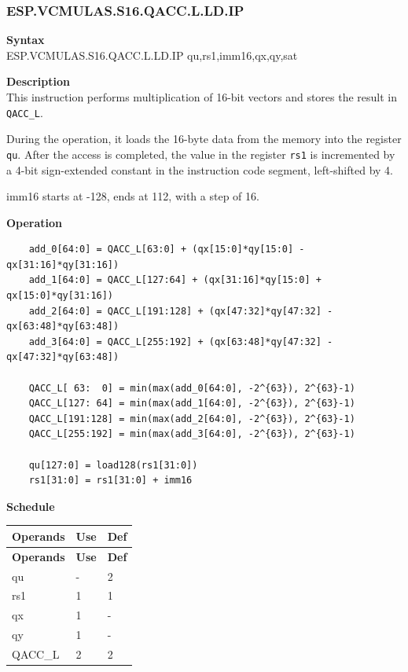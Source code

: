 \newpage
\subsubsection{ESP.VCMULAS.S16.QACC.L.LD.IP}\label{instruction:ESPVCMULASS16QACC_LLDIP}
\textbf{Syntax}\\
ESP.VCMULAS.S16.QACC.L.LD.IP qu,rs1,imm16,qx,qy,sat

\textbf{Description}\\
This instruction performs multiplication of 16-bit vectors and stores the result in \lstinline{QACC_L}.

During the operation, it loads the 16-byte data from the memory into the register \lstinline{qu}. After the access is completed, the value in the register \lstinline{rs1} is incremented by a 4-bit sign-extended constant in the instruction code segment, left-shifted by 4.

imm16 starts at -128, ends at 112, with a step of 16.

\textbf{Operation}\\
\begin{lstlisting}
    add_0[64:0] = QACC_L[63:0] + (qx[15:0]*qy[15:0] - qx[31:16]*qy[31:16])
    add_1[64:0] = QACC_L[127:64] + (qx[31:16]*qy[15:0] + qx[15:0]*qy[31:16])
    add_2[64:0] = QACC_L[191:128] + (qx[47:32]*qy[47:32] - qx[63:48]*qy[63:48])
    add_3[64:0] = QACC_L[255:192] + (qx[63:48]*qy[47:32] - qx[47:32]*qy[63:48])

    QACC_L[ 63:  0] = min(max(add_0[64:0], -2^{63}), 2^{63}-1)
    QACC_L[127: 64] = min(max(add_1[64:0], -2^{63}), 2^{63}-1)
    QACC_L[191:128] = min(max(add_2[64:0], -2^{63}), 2^{63}-1)
    QACC_L[255:192] = min(max(add_3[64:0], -2^{63}), 2^{63}-1)

    qu[127:0] = load128(rs1[31:0])
    rs1[31:0] = rs1[31:0] + imm16
\end{lstlisting}

\textbf{Schedule}\\
\begin{longtable}[c]{|l|l|l|}
    \hline
    \rowcolor{lightgray}
    \textbf{Operands} & \textbf{Use} & \textbf{Def} \\\hline
    \endfirsthead
    \hline
    \rowcolor{lightgray}
     \textbf{Operands} & \textbf{Use} & \textbf{Def} \\\hline
    \endhead
    \hline
    \endfoot

    qu & - & 2 \\\hline
    rs1 & 1 & 1 \\\hline
     qx & 1 & - \\\hline
     qy & 1 & - \\\hline
     QACC\_L & 2 & 2

\end{longtable}

